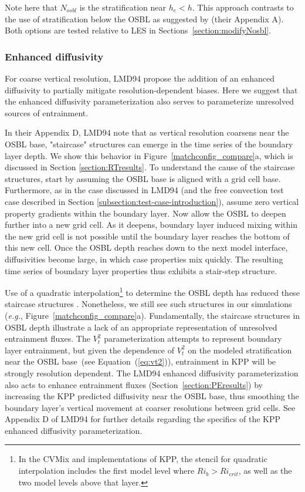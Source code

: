 \documentclass[preprint,12pt,authoryear]{agujournal}
\begin{document}
Note here that $N_{osbl}$ is the stratification near $h_e < h$. This approach contrasts to the use of stratification below the OSBL as suggested by \cite{Danabasoglu2006} (their Appendix A).  Both options are tested relative to LES in Sections~\ref{section:modifyNosbl}.  

\subsubsection{Enhanced diffusivity}
\label{enhancedDiffusivityDescribe}

For coarse vertical resolution, LMD94 propose the addition of an enhanced diffusivity to partially mitigate resolution-dependent biases. Here we suggest that the enhanced diffusivity parameterization also serves to parameterize unresolved sources of entrainment.

In their Appendix D, LMD94 note that as vertical resolution coarsens near the OSBL base, "staircase" structures can emerge in the time series of the boundary layer depth. We show this behavior in  Figure~\ref{matchconfig_compare}a, which is discussed in Section \ref{section:RTresults}. To understand the cause of the staircase structures, start by assuming the OSBL base is aligned with a grid cell base.  Furthermore, as in the case discussed in LMD94 (and the free convection test case described in Section \ref{subsection:test-case-introduction}), assume zero vertical property gradients within the boundary layer. Now allow the OSBL to deepen further into a new grid cell. As it deepens, boundary layer induced mixing within the new grid cell is not possible until the boundary layer reaches the bottom of this new cell. Once the OSBL depth reaches down to the next model interface, diffusivities become large, in which case properties mix quickly.  The resulting time series of boundary layer properties thus exhibits a stair-step structure. 

Use of a quadratic interpolation\footnote{In the CVMix and \cite{Danabasoglu2006} implementations of KPP, the stencil for quadratic interpolation includes the first model level where $Ri_b > Ri_{crit}$, as well as the two model levels above that layer.} to determine the OSBL depth has reduced these staircase structures \citep{Danabasoglu2006}.  Nonetheless, we still see such structures in our simulations (\textit{e.g.}, Figure~\ref{matchconfig_compare}a). 
Fundamentally, the staircase structures in OSBL depth illustrate a lack of an appropriate representation of unresolved entrainment fluxes.  The $V_t^2$ parameterization attempts to represent boundary layer entrainment, but given the dependence of $V_t^2$ on the modeled stratification near the OSBL base~(see Equation~(\ref{eq:vt2})), entrainment in KPP will be strongly resolution dependent. The LMD94 enhanced diffusivity parameterization also acts to enhance entrainment fluxes (Section~\ref{section:PEresults}) by increasing the KPP predicted diffusivity near the OSBL base, thus smoothing the boundary layer's vertical movement at coarser resolutions between grid cells. See Appendix D of LMD94 for further details regarding the specifics of the KPP enhanced diffusivity parameterization.
\end{document}
